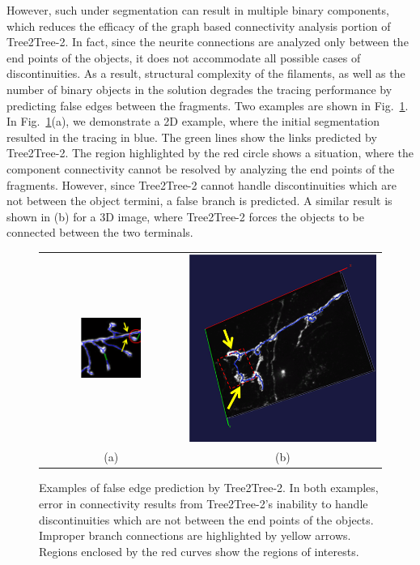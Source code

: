 However, such under segmentation can result in multiple binary components, which reduces the efficacy of the graph based connectivity analysis portion of Tree2Tree-2. In fact, since the neurite connections are analyzed only between the end points of the objects, it does not accommodate all possible cases of discontinuities. As a result, structural complexity of the filaments, as well as the number of binary objects in the solution degrades the tracing performance by predicting false edges between the fragments. Two examples are shown in Fig.~\ref{fig:T2T2_error}. In Fig.~\ref{fig:T2T2_error}(a), we demonstrate a 2D example, where the initial segmentation resulted in the tracing in blue. The green lines show the links predicted by Tree2Tree-2. The region highlighted by the red circle shows a situation, where the component connectivity cannot be resolved by analyzing the end points of the fragments. However, since Tree2Tree-2 cannot handle discontinuities which are not between the object termini, a false branch is predicted. A similar result is shown in (b) for a 3D image, where Tree2Tree-2 forces the objects to be connected between the two terminals. 
\begin{figure}[th]
\centering
\begin{tabular}{cc}
\includegraphics[width=0.45\textwidth]{images/ch3/error1}	&
\includegraphics[height=0.45\textwidth]{images/ch3/error2} \\
\scriptsize (a) & \scriptsize (b)
\end{tabular}
\caption[Tree2Tree-2: connectivity errors]{Examples of false edge prediction by Tree2Tree-2. In both examples, error in connectivity results from Tree2Tree-2's inability to handle discontinuities which are not between the end points of the objects. Improper branch connections are highlighted  by yellow arrows. Regions enclosed by the red curves show the regions of interests. }
\label{fig:T2T2_error}
\end{figure}
